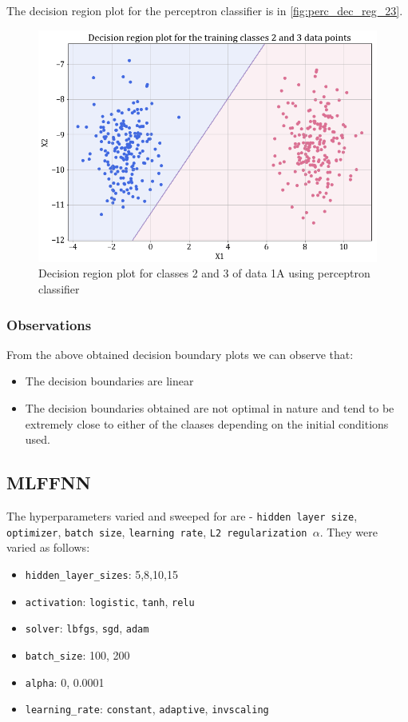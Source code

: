 \documentclass[11pt,a4paper]{article}
\newcommand{\noi}{\noindent}
\def\tt#1{\texttt{#1}}
\begin{document}
\noi
The decision region plot for the perceptron classifier is in \autoref{fig:perc_dec_reg_23}.
\begin{figure}[H]
    \centering
    \includegraphics[scale = 0.45]{images/1A_perceptron_training_classes_2_and_3_dec_reg.png}
    \caption{Decision region plot for classes 2 and 3 of data 1A using perceptron classifier}
    \label{fig:perc_dec_reg_23}
\end{figure}

\subsubsection{Observations}
From the above obtained decision boundary plots we can observe that:
\begin{itemize}
\item The decision boundaries are linear
\item The decision boundaries obtained are not optimal in nature and tend to be extremely close to either of the claases depending on the initial conditions used.
\end{itemize}

\break

\subsection{MLFFNN}
The hyperparameters varied and sweeped for are - \tt{hidden layer size}, \tt{optimizer}, \tt{batch size}, \tt{learning rate}, \tt{L2 regularization $\alpha$}. They were varied as follows:
\begin{itemize}
    \itemsep0em
    \item \tt{hidden\_layer\_sizes}: 5,8,10,15
    \item \tt{activation}: \tt{logistic}, \tt{tanh}, \tt{relu}
    \item \tt{solver}: \tt{lbfgs}, \tt{sgd}, \tt{adam}
    \item \tt{batch\_size}: 100, 200
    \item \tt{alpha}: 0, 0.0001
    \item \tt{learning\_rate}: \tt{constant}, \tt{adaptive}, \tt{invscaling}
\end{itemize}
\end{document}
